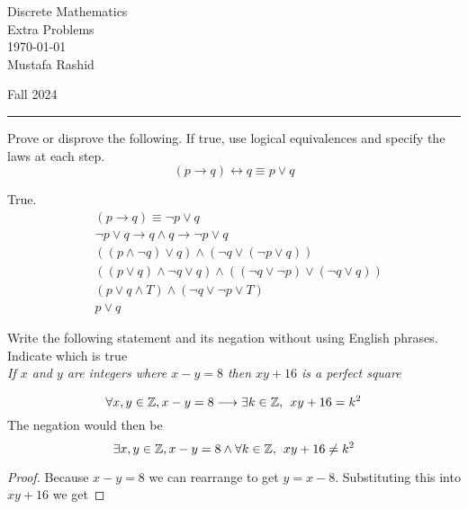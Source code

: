 \documentclass[12pt,letterpaper, onecolumn]{exam}
\begin{document}
	
	\begingroup  
	\noindent\LARGE Discrete Mathematics\\
	\noindent\LARGE Extra Problems\\
	\noindent\large \today\\
	\noindent\large Mustafa Rashid\par
	\noindent\large Fall 2024\par
	\endgroup
	\rule{\textwidth}{0.4pt}
	\pointsdroppedatright
	\printanswers
	\renewcommand{\solutiontitle}{\noindent\textbf{Ans:}\enspace}  

	\begin{questions}
	\question Prove or disprove the following. If true, use logical equivalences and specify the laws at each step.
	$$(p\longrightarrow q) \leftrightarrow q \equiv p\lor q $$
	\begin{solution}
		True.
		\begin{align*}
			&(p \longrightarrow q) \equiv \neg p \lor q \tag{By representation of If-Then as or}\\
			&\neg p \lor q \rightarrow q \land q \rightarrow \neg p \lor q \tag{By definition of the biconditional}\\
			&((p \land \neg q)\lor q)\land(\neg q \lor (\neg p \lor q)) \tag{By representation of If-Then as or and DeMorgaan's}\\
			&((p\lor q)\land \neg q \lor q)\land((\neg q \lor \neg p)\lor (\neg q \lor q)) \tag{By distributive laws}\\
			&(p\lor q \land T) \land (\neg q \lor \neg p \lor T) \tag{By negation laws}\\
			& p \lor q \tag{By identity and universal bound laws}
		\end{align*}
	\end{solution}
	\setcounter{question}{7} \question Write the following statement and its negation without using English phrases. Indicate which is true\\
	 \textit{If $x$ and $y$ are integers where $x-y=8$ then $xy+16$ is a perfect square}
	 \begin{solution}
	 	$$\forall x,y \in \mathbb{Z}, x-y=8 \longrightarrow \exists k \in \mathbb{Z},\hspace*{0.15cm} xy+16 = k^2$$
	 	The negation would then be
	 	$$\exists x,y \in \mathbb{Z}, x-y=8 \land \forall k \in \mathbb{Z},\hspace*{0.15cm}xy+16\neq k^2$$
	 	\begin{proof}
	 	Because $x-y=8$ we can rearrange to get $y=x-8$. Substituting this into $xy+16$ we get

\end{proof}
\end{solution}
\end{questions}
\end{document}
